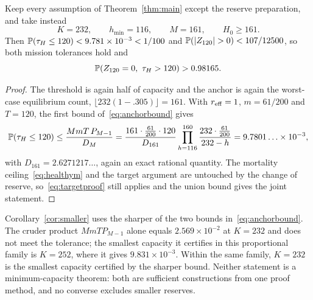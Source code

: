 \begin{corollary}\label{cor:smaller}
Keep every assumption of Theorem~\ref{thm:main} except the reserve preparation, and take instead
\[
 K=232,\qquad h_{\min}=116,\qquad M=161,\qquad H_0\ge161 .
\]
Then $\mathbb P(\tau_H\le120)<9.781\times10^{-3}<1/100$ and $\Prob(|Z_{120}|>0)<107/12500$, so both mission tolerances hold and
\[
 \mathbb P(Z_{120}=0,\ \tau_H>120)>0.98165 .
\]
\end{corollary}

\begin{proof}
The threshold is again half of capacity and the anchor is again the worst-case equilibrium count, $\lfloor232(1-.305)\rfloor=161$. With $r_{\mathrm{eff}}=1$, $m=61/200$ and $T=120$, the first bound of~\eqref{eq:anchorbound} gives
\[
 \mathbb P(\tau_H\le120)\le\frac{MmT\,P_{M-1}}{D_M}
 =\frac{161\cdot\frac{61}{200}\cdot120}{D_{161}}
 \prod_{h=116}^{160}\frac{232\cdot\frac{61}{200}}{232-h}
 =9.7801\ldots\times10^{-3},
\]
with $D_{161}=2.6271217\ldots$, again an exact rational quantity. The mortality ceiling~\eqref{eq:healthym} and the target argument are untouched by the change of reserve, so~\eqref{eq:targetproof} still applies and the union bound gives the joint statement.
\end{proof}

\begin{remark}\label{rem:cruder}
Corollary~\ref{cor:smaller} uses the sharper of the two bounds in~\eqref{eq:anchorbound}. The cruder product $MmTP_{M-1}$ alone equals $2.569\times10^{-2}$ at $K=232$ and does not meet the tolerance; the smallest capacity it certifies in this proportional family is $K=252$, where it gives $9.831\times10^{-3}$. Within the same family, $K=232$ is the smallest capacity certified by the sharper bound. Neither statement is a minimum-capacity theorem: both are sufficient constructions from one proof method, and no converse excludes smaller reserves.
\end{remark}
